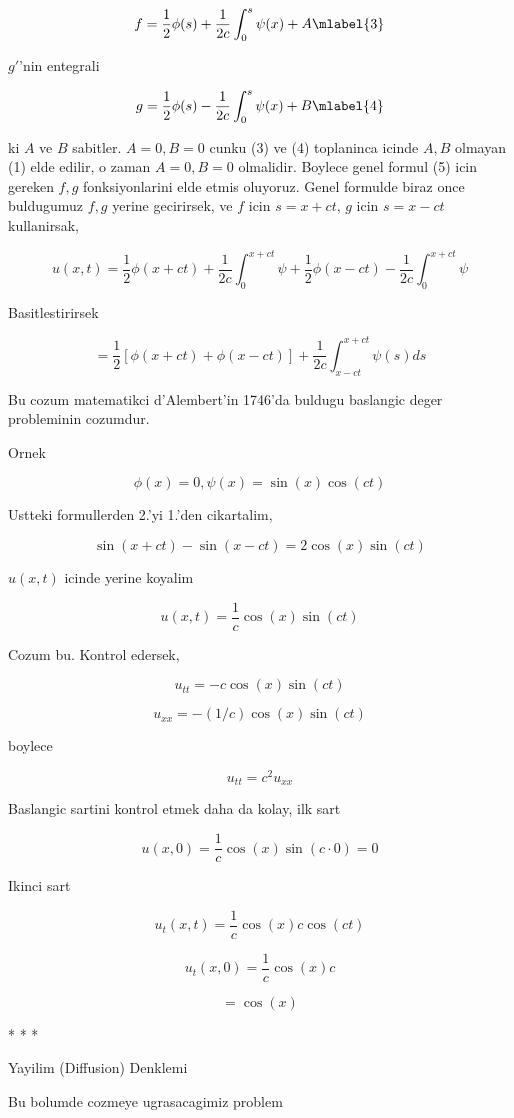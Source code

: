\documentclass[12pt,fleqn]{article}\usepackage{../common}
\begin{document}
\[ f = \frac{1}{2}\phi(s) + \frac{1}{2c} \int_0^s \psi(x) + A 
\mlabel{3}
\]

$g'$'nin entegrali

\[ g = \frac{1}{2}\phi(s) - \frac{1}{2c} \int_0^s \psi(x) + B
\mlabel{4}
\]


ki $A$ ve $B$ sabitler. $A=0,B=0$ cunku (3) ve (4) toplaninca icinde $A,B$
olmayan (1) elde edilir, o zaman $A=0,B=0$ olmalidir. Boylece genel formul
(5) icin gereken $f,g$ fonksiyonlarini elde etmis oluyoruz. Genel formulde
biraz once buldugumuz $f,g$ yerine gecirirsek, ve $f$ icin $s = x+ct$, $g$
icin $s = x-ct$ kullanirsak,

\[ u(x,t) = 
\frac{1}{2}\phi(x+ct) + 
\frac{1}{2c} \int_0 ^{x+ct} \psi + 
\frac{1}{2}\phi(x-ct) -
\frac{1}{2c} \int_0 ^{x+ct} \psi 
 \]

Basitlestirirsek 

\[ = \frac{1}{2}[\phi(x+ct) + \phi(x-ct)] + 
\frac{1}{2c} \int_{x-ct} ^{x+ct} \psi (s) ds
 \]

Bu cozum matematikci d'Alembert'in 1746'da buldugu baslangic deger
probleminin cozumdur. 

Ornek

\[ \phi(x) = 0, \psi(x) = \sin(x)\cos(ct) \]

Ustteki formullerden 2.'yi 1.'den cikartalim, 

\[ \sin(x+ct) - \sin(x-ct) = 2\cos(x)\sin(ct) \]

$u(x,t)$ icinde yerine koyalim

\[ u(x,t) = \frac{1}{c}\cos(x)\sin(ct) \]

Cozum bu. Kontrol edersek, 

\[ u_{tt} = -c \cos(x)\sin(ct) \]

\[ u_{xx} = -(1/c)\cos(x)\sin(ct) \]

boylece 

\[ u_{tt} = c^2 u_{xx} \]

Baslangic sartini kontrol etmek daha da kolay, ilk sart

\[ u(x,0) = \frac{1}{c}\cos(x)\sin(c \cdot 0)  = 0\]

Ikinci sart

\[ u_t(x,t) = \frac{1}{c}\cos(x) c \cos(ct) \]

\[ u_t(x,0) = \frac{1}{c}\cos(x) c \]

\[  = \cos(x) \]


* * * 


Yayilim (Diffusion) Denklemi

Bu bolumde cozmeye ugrasacagimiz problem
\end{document}
